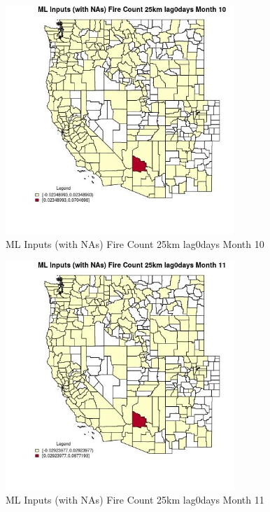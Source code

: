 \begin{figure} 
\centering  
\includegraphics[width=0.77\textwidth]{Code_Outputs/Report_ML_input_PM25_Step4_part_e_de_duplicated_aves_compiled_2019-05-20wNAs_CountyFire_Count_25km_lag0daysmedianMonth10.jpg} 
\caption{\label{fig:Report_ML_input_PM25_Step4_part_e_de_duplicated_aves_compiled_2019-05-20wNAsCountyFire_Count_25km_lag0daysmedianMonth10}ML Inputs (with NAs) Fire Count 25km lag0days Month 10} 
\end{figure} 
 

\clearpage 

\begin{figure} 
\centering  
\includegraphics[width=0.77\textwidth]{Code_Outputs/Report_ML_input_PM25_Step4_part_e_de_duplicated_aves_compiled_2019-05-20wNAs_CountyFire_Count_25km_lag0daysmedianMonth11.jpg} 
\caption{\label{fig:Report_ML_input_PM25_Step4_part_e_de_duplicated_aves_compiled_2019-05-20wNAsCountyFire_Count_25km_lag0daysmedianMonth11}ML Inputs (with NAs) Fire Count 25km lag0days Month 11} 
\end{figure} 
 

